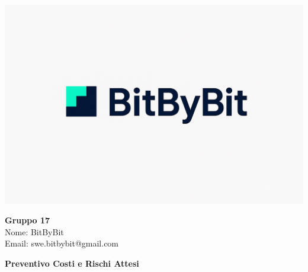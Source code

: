 \documentclass[a4paper,12pt]{article}
\begin{document}
\begin{center}
    \begin{minipage}{0.25\textwidth}
        \centering
        \includegraphics[width=\linewidth]{logo.png}
    \end{minipage}
    \hfill
    \begin{minipage}{0.7\textwidth}
        \raggedright
        {\LARGE \textbf{Gruppo 17}}\\[0.3cm]
        {\large
        Nome: BitByBit\\
        Email: swe.bitbybit@gmail.com
        }
    \end{minipage}
\end{center}

\vspace{1.5cm}

\begin{center}
    {\LARGE \textbf{Preventivo Costi e Rischi Attesi}}
\end{center}

\vspace*{\fill} %

\clearpage

\clearpage
\tableofcontents
\thispagestyle{empty} %
\clearpage

\end{document}
